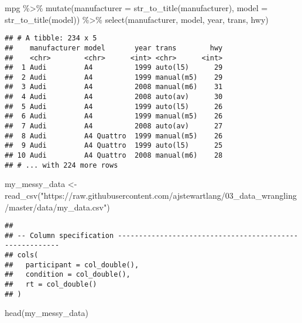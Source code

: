 \documentclass[
]{article}
\newenvironment{Shaded}{\begin{snugshade}}{\end{snugshade}}
\newcommand{\AttributeTok}[1]{\textcolor[rgb]{0.77,0.63,0.00}{#1}}
\newcommand{\FunctionTok}[1]{\textcolor[rgb]{0.00,0.00,0.00}{#1}}
\newcommand{\NormalTok}[1]{#1}
\newcommand{\OtherTok}[1]{\textcolor[rgb]{0.56,0.35,0.01}{#1}}
\newcommand{\SpecialCharTok}[1]{\textcolor[rgb]{0.00,0.00,0.00}{#1}}
\newcommand{\StringTok}[1]{\textcolor[rgb]{0.31,0.60,0.02}{#1}}
\begin{document}
\begin{Shaded}
\begin{Highlighting}[]
\NormalTok{mpg }\SpecialCharTok{\%\textgreater{}\%}
  \FunctionTok{mutate}\NormalTok{(}\AttributeTok{manufacturer =} \FunctionTok{str\_to\_title}\NormalTok{(manufacturer), }
         \AttributeTok{model =} \FunctionTok{str\_to\_title}\NormalTok{(model)) }\SpecialCharTok{\%\textgreater{}\%}
  \FunctionTok{select}\NormalTok{(manufacturer, model, year, trans, hwy)}
\end{Highlighting}
\end{Shaded}

\begin{verbatim}
## # A tibble: 234 x 5
##    manufacturer model       year trans        hwy
##    <chr>        <chr>      <int> <chr>      <int>
##  1 Audi         A4          1999 auto(l5)      29
##  2 Audi         A4          1999 manual(m5)    29
##  3 Audi         A4          2008 manual(m6)    31
##  4 Audi         A4          2008 auto(av)      30
##  5 Audi         A4          1999 auto(l5)      26
##  6 Audi         A4          1999 manual(m5)    26
##  7 Audi         A4          2008 auto(av)      27
##  8 Audi         A4 Quattro  1999 manual(m5)    26
##  9 Audi         A4 Quattro  1999 auto(l5)      25
## 10 Audi         A4 Quattro  2008 manual(m6)    28
## # ... with 224 more rows
\end{verbatim}

\begin{Shaded}
\begin{Highlighting}[]
\NormalTok{my\_messy\_data }\OtherTok{\textless{}{-}} \FunctionTok{read\_csv}\NormalTok{(}\StringTok{"https://raw.githubusercontent.com/ajstewartlang/03\_data\_wrangling/master/data/my\_data.csv"}\NormalTok{)}
\end{Highlighting}
\end{Shaded}

\begin{verbatim}
## 
## -- Column specification --------------------------------------------------------
## cols(
##   participant = col_double(),
##   condition = col_double(),
##   rt = col_double()
## )
\end{verbatim}

\begin{Shaded}
\begin{Highlighting}[]
\FunctionTok{head}\NormalTok{(my\_messy\_data)}
\end{Highlighting}
\end{Shaded}
\end{document}
